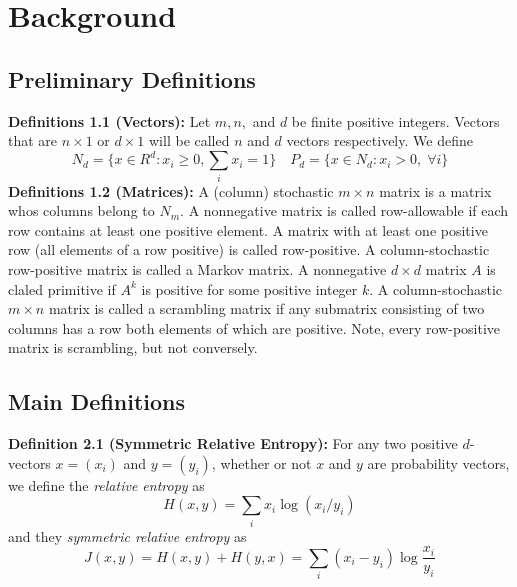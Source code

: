 \section{Background}
\subsection*{Preliminary Definitions}
\noindent\textbf{Definitions 1.1 (Vectors):} Let $m,n,$ and $d$ be finite positive integers. Vectors that are $n \times 1$ or $d \times 1$ will be called $n$ and $d$ vectors respectively. We define 
\[N_d = \{x \in R^d : x_i \geq 0, \sum_i x_i = 1\} \quad P_d = \{x \in N_d : x_i > 0, \; \forall i\}\]
\noindent\textbf{Definitions 1.2 (Matrices):} A (column) stochastic $m \times n$ matrix is a matrix whos columns belong to $N_m$. A nonnegative matrix is called row-allowable if each row contains at least one positive element. A matrix with at least one positive row (all elements of a row positive) is called row-positive. A column-stochastic row-positive matrix is called a Markov matrix. A nonnegative $d \times d$ matrix $A$ is claled primitive if $A^k$ is positive for some positive integer $k$. A column-stochastic $m \times n$ matrix is called a scrambling matrix if any submatrix consisting of two columns has a row both elements of which are positive. Note, every row-positive matrix is scrambling, but not conversely.


\subsection*{Main Definitions}\label{sssec:def2.1}
\noindent\textbf{Definition 2.1 (Symmetric Relative Entropy):} For any two positive $d$-vectors $x = (x_i)$ and $y = (y_i)$, whether or not $x$ and $y$ are probability vectors, we define the \textit{relative entropy} as \[H(x,y) = \sum_i x_i \log(x_i/y_i)\]
and they \textit{symmetric relative entropy} as 
\[J(x,y) = H(x,y) + H(y, x) = \sum_i (x_i - y_i) \log \frac{x_i}{y_i}\]
